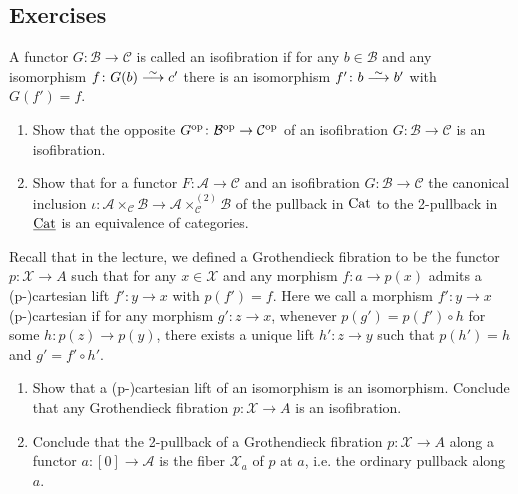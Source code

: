 \subsection{Exercises}

\begin{Exercise}
	A functor $ G \colon \mathcal{ B } \to \mathcal{ C } $ is called an isofibration if for any $ b \in \mathcal{ B } $ and any isomorphism $ f \colon G ( b ) \isomorphism c' $ there is an isomorphism $ f' \colon b \isomorphism b'$ with $ G ( f' ) = f $.
	
	\begin{enumerate}[label=(\alph*)]
		\item 
		Show that the opposite $ G^{ \operatorname{op} } \colon  \mathcal{ B }^{ \operatorname{op} } \to \mathcal{ C }^{ \operatorname{op} } $ of an isofibration $ G \colon \mathcal{ B } \to \mathcal{ C } $ is an isofibration.
		
		\item 
		Show that for a functor $ F \colon \mathcal{ A } \to \mathcal{ C } $ and an isofibration $ G \colon \mathcal{ B } \to \mathcal{ C } $
		the canonical inclusion $ \iota \colon \mathcal{ A } \times_ { \mathcal{ C } } \mathcal{ B } \to \mathcal{ A } \times^{ ( 2 ) }_{ \mathcal{ C } } \mathcal{ B } $ of the pullback in $ \operatorname{Cat} $ to the 2-pullback in $ \underline{ \operatorname{Cat} } $ is an equivalence of categories.
	\end{enumerate}
	
	Recall that in the lecture, we defined a Grothendieck fibration to be the functor $ p \colon \mathcal{ X } \to  A $ such that for any $ x \in \mathcal{ X } $ and any morphism $ f \colon a \to p ( x ) $ admits a (p-)cartesian lift $ f' \colon y \to x $ with $ p ( f' ) = f $.
	Here we call a morphism $ f' \colon y \to x $ (p-)cartesian if for any morphism $ g' \colon z \to x $, whenever $ p ( g' ) = p ( f' ) \circ h $ for some $ h \colon p ( z ) \to p ( y ) $, there exists a unique lift $ h' \colon z \to y $ such that $ p ( h' ) = h $ and $ g' = f' \circ h' $.
	
	\begin{enumerate}[resume, label=(\alph*)]
		\item 
		Show that a (p-)cartesian lift of an isomorphism is an isomorphism.
		Conclude that any Grothendieck fibration $ p \colon \mathcal{ X } \to A $ is an isofibration.
		
		\item 
		Conclude that the 2-pullback of a Grothendieck fibration $ p \colon \mathcal{ X } \to  A $ along a functor $ a \colon [ 0 ] \to \mathcal{ A } $ is the fiber $ \mathcal{ X }_a $ of $ p $ at $ a $, i.e. the ordinary pullback along $ a $.
	\end{enumerate}
\end{Exercise}

